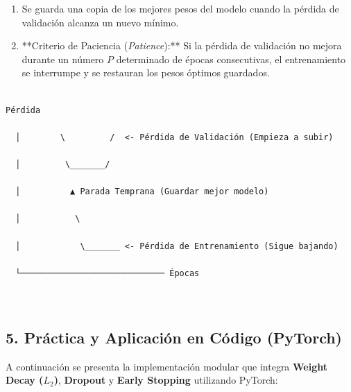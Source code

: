 \documentclass[11pt,oneside]{article}
\begin{document}
\begin{enumerate}

\item Se guarda una copia de los mejores pesos del modelo cuando la pérdida de validación alcanza un nuevo mínimo.

\item **Criterio de Paciencia (\emph{Patience}):** Si la pérdida de validación no mejora durante un número \(P\) determinado de épocas consecutivas, el entrenamiento se interrumpe y se restauran los pesos óptimos guardados.

\end{enumerate}

\begin{lstlisting}

Pérdida

  │        \         /  <- Pérdida de Validación (Empieza a subir)

  │         \_______/

  │          ▲ Parada Temprana (Guardar mejor modelo)

  │           \

  │            \_______ <- Pérdida de Entrenamiento (Sigue bajando)

  └───────────────────────────── Épocas



\end{lstlisting}

\subsection{5. Práctica y Aplicación en Código (PyTorch)}

A continuación se presenta la implementación modular que integra \textbf{Weight Decay (\(L_2\))}, \textbf{Dropout} y \textbf{Early Stopping} utilizando PyTorch:
\end{document}
